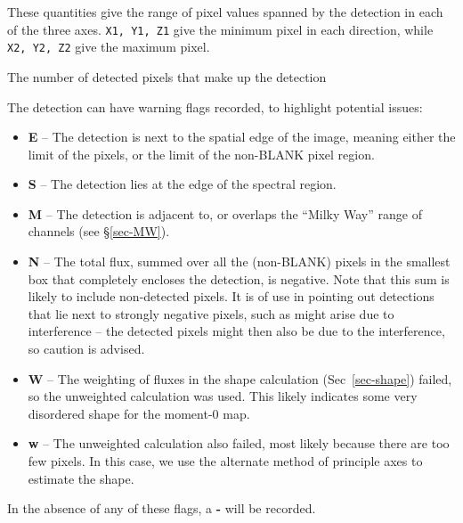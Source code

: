 
These quantities give the range of pixel values spanned by the
detection in each of the three axes. \texttt{X1, Y1, Z1} give the
minimum pixel in each direction, while \texttt{X2, Y2, Z2} give the
maximum pixel.


The number of detected pixels that make up the detection 

\label{sec-flags}

The detection can have warning flags recorded, to highlight potential
issues:
\begin{itemize}
\item \textbf{E} -- The detection is next to the spatial edge of the
  image, meaning either the limit of the pixels, or the limit of the
  non-BLANK pixel region.
\item \textbf{S} -- The detection lies at the edge of the spectral
  region.
\item \textbf{M} -- The detection is adjacent to, or overlaps the
  ``Milky Way'' range of channels (see \S\ref{sec-MW}).
\item \textbf{N} -- The total flux, summed over all the (non-BLANK)
  pixels in the smallest box that completely encloses the detection,
  is negative. Note that this sum is likely to include non-detected
  pixels. It is of use in pointing out detections that lie next to
  strongly negative pixels, such as might arise due to interference --
  the detected pixels might then also be due to the interference, so
  caution is advised.
\item \textbf{W} -- The weighting of fluxes in the shape calculation
  (Sec~\ref{sec-shape}) failed, so the unweighted calculation was
  used. This likely indicates some very disordered shape for the
  moment-0 map.
\item \textbf{w} -- The unweighted calculation also failed, most
  likely because there are too few pixels. In this case, we use the
  alternate method of principle axes to estimate the shape.
\end{itemize}
In the absence of any of these flags, a \textbf{-} will be recorded.


